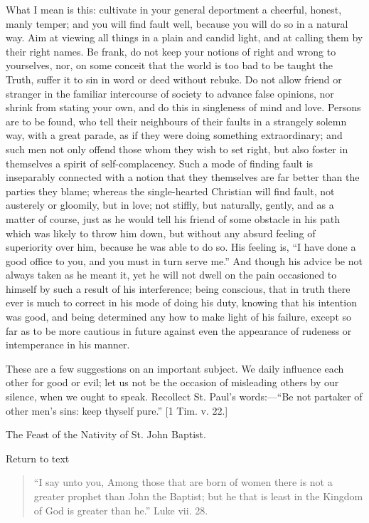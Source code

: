 What I mean is this: cultivate in your general deportment a cheerful,
honest, manly temper; and you will find fault well, because you will do
so in a natural way. Aim at viewing all things in a plain and candid
light, and at calling them by their right names. Be frank, do not keep
your notions of right and wrong to yourselves, nor, on some conceit that
the world is too bad to be taught the Truth, suffer it to sin in word or
deed without rebuke. Do not allow friend or stranger in the familiar
intercourse of society to advance false opinions, nor shrink from
stating your own, and do this in singleness of mind and love. Persons
are to be found, who tell their neighbours of their faults in a
strangely solemn way, with a great parade, as if they were doing
something extraordinary; and such men not only offend those whom they
wish to set right, but also foster in themselves a spirit of
self-complacency. Such a mode of finding fault is inseparably connected
with a notion that they themselves are far better than the parties they
blame; whereas the single-hearted Christian will find fault, not
austerely or gloomily, but in love; not stiffly, but naturally, gently,
and as a matter of course, just as he would tell his friend of some
obstacle in his path which was likely to throw him down, but without any
absurd feeling of superiority over him, because he was able to do so.
His feeling is, ``I have done a good office to you, and you must in
turn serve me.'' And though his advice be not always taken as he
meant it, yet he will not dwell on the pain occasioned to himself by
such a result of his interference; being conscious, that in truth there
ever is much to correct in his mode of doing his duty, knowing that his
intention was good, and being determined any how to make light of his
failure, except so far as to be more cautious in future against even the
appearance of rudeness or intemperance in his manner.

These are a few suggestions on an important subject. We daily
influence each other for good or evil; let us not be the occasion of
misleading others by our silence, when we ought to speak. Recollect St.
Paul's words:—``Be not partaker of other men's sins: keep thyself
pure.'' [1 Tim. v. 22.]


The Feast of the Nativity of St. John Baptist.

Return to text


\begin{quote}

``I say unto you, Among those that are born of women there is
not a greater prophet than John the Baptist; but he that is least in
the Kingdom of God is greater than he.'' Luke vii. 28.

\end{quote}

